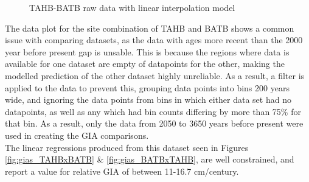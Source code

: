 \begin{figure}[h]
	\caption{TAHB-BATB raw data with linear interpolation model}
	\label{fig:data_TAHBxBATB}
\end{figure}

The data plot for the site combination of TAHB and BATB shows a common issue
with comparing datasets, as the data with ages more recent than the 2000 year before
present gap is unsable. This is because the regions where data is available for
one dataset are empty of datapoints for the other, making the modelled prediction
of the other dataset highly unreliable. As a result, a filter is applied to the
data to prevent this, grouping data points into bins 200 years wide, and
ignoring the data points from bins in which either data set had no datapoints,
as well as any which had bin counts differing by more than 75\% for that bin.
As a result, only the data from 2050 to 3650 years before present were used in
creating the GIA comparisons.\\
The linear regressions produced from this dataset seen in Figures 
\ref{fig:gias_TAHBxBATB} \& \ref{fig:gias_BATBxTAHB}, are well constrained, and
report a value for relative GIA of between 11-16.7 cm/century.

\newpage

